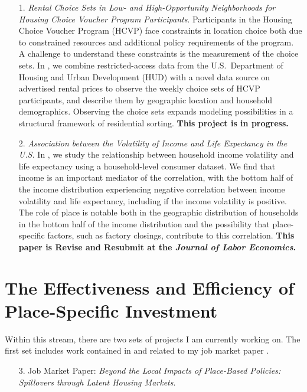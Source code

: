 \begin{enumerate}

\item[1.] \textit{Rental Choice Sets in Low- and High-Opportunity Neighborhoods for Housing Choice Voucher Program Participants}. Participants in the Housing Choice Voucher Program (HCVP) face constraints in location choice both due to constrained resources and additional policy requirements of the program. A challenge to understand these constraints is the measurement of the choice sets. In \citet{park_rental_2023}, we combine restricted-access data from the U.S.\ Department of Housing and Urban Development (HUD) with a novel data source on advertised rental prices to observe the weekly choice sets of HCVP participants, and describe them by geographic location and household demographics. Observing the choice sets expands modeling possibilities in a structural framework of residential sorting. \textbf{This project is in progress.}


\item[2.] \textit{Association between the Volatility of Income and Life Expectancy in the U.S.} In \citet{ziff_association_2023}, we study the relationship between household income volatility and life expectancy using a household-level consumer dataset. We find that income is an important mediator of the correlation, with the bottom half of the income distribution experiencing negative correlation between income volatility and life expectancy, including if the income volatility is positive. The role of place is notable both in the geographic distribution of households in the bottom half of the income distribution and the possibility that place-specific factors, such as factory closings, contribute to this correlation. \textbf{This paper is Revise and Resubmit at the \textit{Journal of Labor Economics}.}


\end{enumerate}

\section{The Effectiveness and Efficiency of Place-Specific Investment}

Within this stream, there are two sets of projects I am currently working on. The first set includes work contained in and related to my job market paper \citep{ziff_local_2023}. 


\begin{enumerate}
\item[3.] Job Market Paper: \textit{Beyond the Local Impacts of Place-Based Policies: Spillovers through Latent Housing Markets}.
\end{enumerate}

